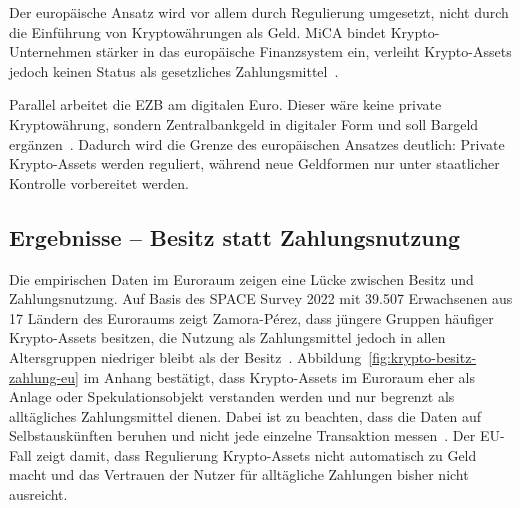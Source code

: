 Der europäische Ansatz wird vor allem durch Regulierung umgesetzt, nicht durch die Einführung von Kryptowährungen als Geld. MiCA bindet Krypto-Unternehmen stärker in das europäische Finanzsystem ein, verleiht Krypto-Assets jedoch keinen Status als gesetzliches Zahlungsmittel~\cite{BundesbankMiCAR}.

Parallel arbeitet die EZB am digitalen Euro. Dieser wäre keine private Kryptowährung, sondern Zentralbankgeld in digitaler Form und soll Bargeld ergänzen~\cite{ECB2025}. Dadurch wird die Grenze des europäischen Ansatzes deutlich: Private Krypto-Assets werden reguliert, während neue Geldformen nur unter staatlicher Kontrolle vorbereitet werden.

\subsection{Ergebnisse -- Besitz statt Zahlungsnutzung}

Die empirischen Daten im Euroraum zeigen eine Lücke zwischen Besitz und Zahlungsnutzung. Auf Basis des SPACE Survey 2022 mit 39.507 Erwachsenen aus 17 Ländern des Euroraums zeigt Zamora-Pérez, dass jüngere Gruppen häufiger Krypto-Assets besitzen, die Nutzung als Zahlungsmittel jedoch in allen Altersgruppen niedriger bleibt als der Besitz~\cite{Zamora2026}.
Abbildung~\ref{fig:krypto-besitz-zahlung-eu} im Anhang bestätigt, dass Krypto-Assets im Euroraum eher als Anlage oder Spekulationsobjekt verstanden werden und nur begrenzt als alltägliches Zahlungsmittel dienen. Dabei ist zu beachten, dass die Daten auf Selbstauskünften beruhen und nicht jede einzelne Transaktion messen~\cite{Zamora2026}. Der EU-Fall zeigt damit, dass Regulierung Krypto-Assets nicht automatisch zu Geld macht und das Vertrauen der Nutzer für alltägliche Zahlungen bisher nicht ausreicht.

\endinput
